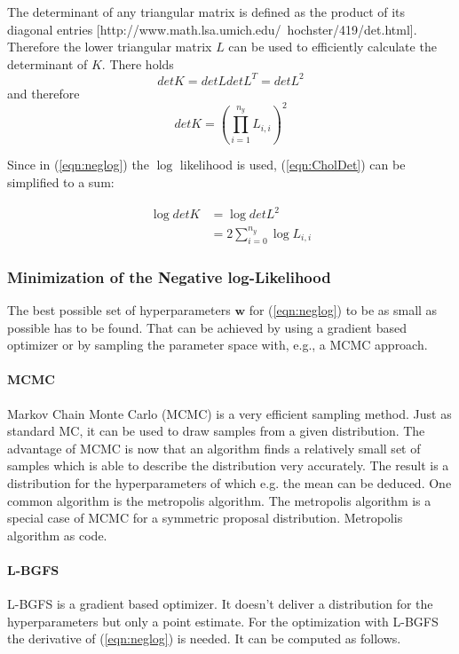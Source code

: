 \documentclass[%
  a4paper,oneside,%
  11pt,%
  smallchapters,
  green,%
  rgb, <cmyk>
  ,]{tubsbook}
\begin{document}
The determinant of any triangular matrix is defined as the product of its diagonal entries [http://www.math.lsa.umich.edu/~hochster/419/det.html]. Therefore the lower triangular matrix $L$ can be used to efficiently calculate the determinant of $K$. There holds
\begin{equation}
det K = det L det L^T = det L ^2
\end{equation}
and therefore
\begin{equation}
det K = \left(    \prod_{i=1}^{n_y}  L_{i,i}  \right)^2
\label{eqn:CholDet}
\end{equation}

Since in (\ref{eqn:neglog}) the $\log$ likelihood is used, (\ref{eqn:CholDet}) can be simplified to a sum:

\begin{align*}
\log{det K} &= \log{det L}^2 \\
&= 2 \sum_{i=0}^{n_y} \log{L_{i,i}}
\end{align*}

\subsubsection{Minimization of the Negative log-Likelihood}
The best possible set of hyperparameters $\bm{w}$ for (\ref{eqn:neglog}) to be as small as possible has to be found. That can be achieved by using a gradient based optimizer or by sampling the parameter space with, e.g., a MCMC approach.
\paragraph{MCMC}
Markov Chain Monte Carlo (MCMC) is a very efficient sampling method. Just as standard MC, it can be used to draw samples from a given distribution. The advantage of MCMC is now that an algorithm finds a relatively small set of samples which is able to describe the distribution very accurately. The result is a distribution for the hyperparameters of which e.g. the mean can be deduced. One common algorithm is the metropolis algorithm.
The metropolis algorithm is a special case of MCMC for a symmetric proposal distribution.
Metropolis algorithm as code. 



\paragraph{L-BGFS}
L-BGFS is a gradient based optimizer. It doesn't deliver a distribution for the hyperparameters but only a point estimate.
For the optimization with L-BGFS the derivative of (\ref{eqn:neglog}) is needed. It can be computed as follows.
\end{document}
